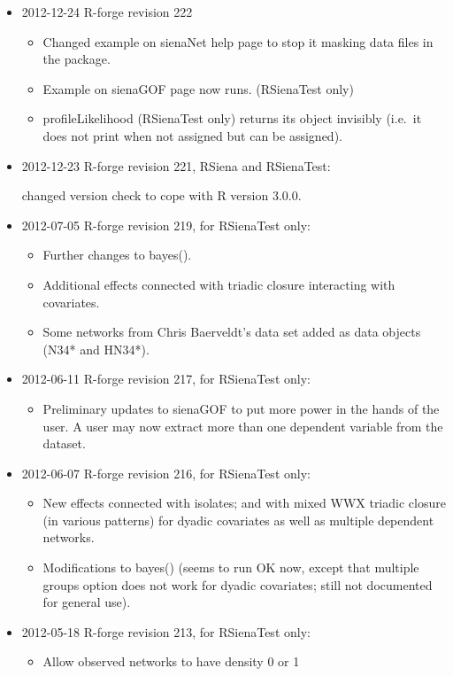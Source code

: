 \documentclass[a4paper,fleqn,11pt]{article}
\newcommand{\+}{\, + \,}
\newcommand{\sfn}[1]{\textsf{#1}}
\begin{document}
\begin{small}
\begin{itemize}
\item 2012-12-24 R-forge revision 222
\begin{itemize}
\item Changed example on \sfn{sienaNet} help page to stop it masking data files
  in the package.
\item Example on \sfn{sienaGOF} page now runs. (RSienaTest only)
\item \sfn{profileLikelihood} (RSienaTest only) returns its object invisibly
  (i.e.\  it does not print when not assigned but can be assigned).
\end{itemize}
\item 2012-12-23 R-forge revision 221, RSiena and RSienaTest:

  changed version check to cope with R version 3.0.0.
\item 2012-07-05 R-forge revision 219, for RSienaTest only:
\begin{itemize}
  \item Further changes to bayes().
  \item Additional effects connected with triadic closure interacting with
    covariates.
  \item Some networks from Chris Baerveldt's data set added
        as data objects (N34* and HN34*).
\end{itemize}
\item 2012-06-11 R-forge revision 217, for RSienaTest only:
\begin{itemize}
  \item Preliminary updates to sienaGOF to put more power in the hands of the
  user.
  A user may now extract more than one dependent variable from the dataset.
\end{itemize}
\item 2012-06-07 R-forge revision 216, for RSienaTest only:
\begin{itemize}
  \item New effects connected with isolates; and with mixed WWX triadic closure
      (in various patterns) for dyadic covariates as well as multiple
      dependent networks.
  \item Modifications to bayes() (seems to run OK now, except that multiple
      groups option does not work for dyadic covariates;
      still not documented for general use).
\end{itemize}
\item 2012-05-18 R-forge revision 213, for RSienaTest only:
    \begin{itemize}
     \item Allow observed networks to have density 0 or 1

\end{itemize}
\end{itemize}
\end{small}
\end{document}
